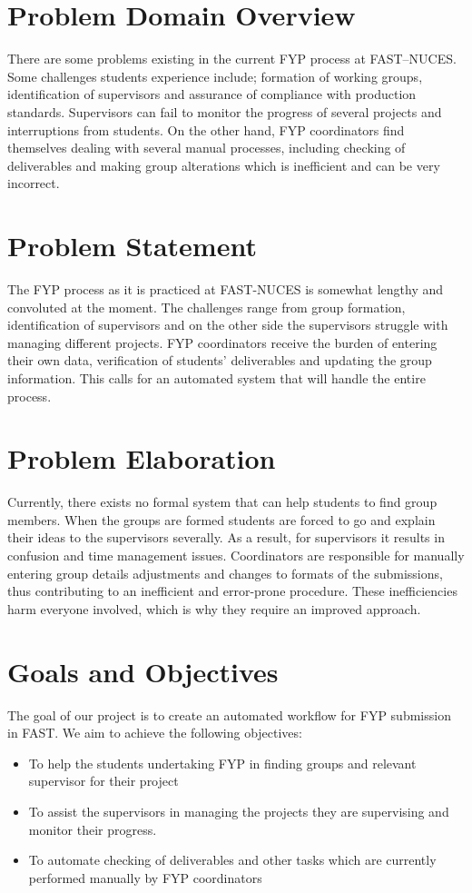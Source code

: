 \documentclass{FastFyp}
\begin{document}
\section{Problem Domain Overview}
There are some problems existing in the current FYP process at FAST–NUCES. Some challenges students experience include; formation of working groups, identification of supervisors and assurance of compliance with production standards. Supervisors can fail to monitor the progress of several projects and interruptions from students. On the other hand, FYP coordinators find themselves dealing with several manual processes, including checking of deliverables and making group alterations which is inefficient and can be very incorrect.
\section{Problem Statement}
The FYP process as it is practiced at FAST-NUCES is somewhat lengthy and convoluted at the moment. The challenges range from group formation, identification of supervisors and on the other side the supervisors struggle with managing different projects. FYP coordinators receive the burden of entering their own data, verification of students’ deliverables and updating the group information. This calls for an automated system that will handle the entire process.
\section{Problem Elaboration}
Currently, there exists no formal system that can help students to find group members. When the groups are formed students are forced to go and explain their ideas to the supervisors severally. As a result, for supervisors it results in confusion and time management issues. Coordinators are responsible for manually entering group details adjustments and changes to formats of the submissions, thus contributing to an inefficient and error-prone procedure. These inefficiencies harm everyone involved, which is why they require an improved approach.
\section{Goals and Objectives}
The goal of our project is to create an automated workflow for FYP submission in FAST. We
aim to achieve the following objectives:
\begin{itemize}
    \item To help the students undertaking FYP in finding groups and relevant supervisor for
their project
   \item To assist the supervisors in managing the projects they are supervising and monitor
their progress.
   \item To automate checking of deliverables and other tasks which are currently performed
manually by FYP coordinators
\end{itemize}
\end{document}
